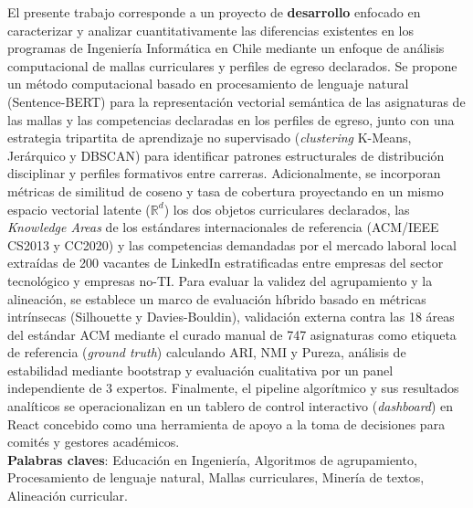 \documentclass[12pt,letterpaper]{article}
\begin{document}
El presente trabajo corresponde a un proyecto de \textbf{desarrollo} enfocado en caracterizar y analizar cuantitativamente las diferencias existentes en los programas de Ingeniería Informática en Chile mediante un enfoque de análisis computacional de mallas curriculares y perfiles de egreso declarados. Se propone un método computacional basado en procesamiento de lenguaje natural (Sentence-BERT) para la representación vectorial semántica de las asignaturas de las mallas y las competencias declaradas en los perfiles de egreso, junto con una estrategia tripartita de aprendizaje no supervisado (\textit{clustering} K-Means, Jerárquico y DBSCAN) para identificar patrones estructurales de distribución disciplinar y perfiles formativos entre carreras. Adicionalmente, se incorporan métricas de similitud de coseno y tasa de cobertura proyectando en un mismo espacio vectorial latente ($\mathbb{R}^d$) los dos objetos curriculares declarados, las \textit{Knowledge Areas} de los estándares internacionales de referencia (ACM/IEEE CS2013 y CC2020) y las competencias demandadas por el mercado laboral local extraídas de 200 vacantes de LinkedIn estratificadas entre empresas del sector tecnológico y empresas no-TI. Para evaluar la validez del agrupamiento y la alineación, se establece un marco de evaluación híbrido basado en métricas intrínsecas (Silhouette y Davies-Bouldin), validación externa contra las 18 áreas del estándar ACM mediante el curado manual de 747 asignaturas como etiqueta de referencia (\textit{ground truth}) calculando ARI, NMI y Pureza, análisis de estabilidad mediante bootstrap y evaluación cualitativa por un panel independiente de 3 expertos. Finalmente, el pipeline algorítmico y sus resultados analíticos se operacionalizan en un tablero de control interactivo (\textit{dashboard}) en React concebido como una herramienta de apoyo a la toma de decisiones para comités y gestores académicos.\\

\noindent
\textbf{Palabras claves}: Educación en Ingeniería, Algoritmos de agrupamiento, Procesamiento de lenguaje natural, Mallas curriculares, Minería de textos, Alineación curricular.

\newpage
\tableofcontents

% 
% 

\renewcommand{\thepage}{\arabic{page}}
\setcounter{page}{1}





\end{document}
